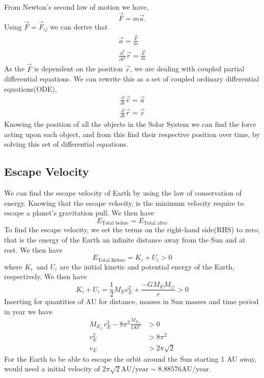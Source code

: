 \documentclass[%
reprint,
nofootinbib,
amsmath,amssymb,
aps,
]{revtex4-1}
\begin{document}
From Newton's second law of motion we have,
\begin{equation}
 \vec{F} = m\vec{a}.
\end{equation}
Using $\vec{F} = \vec{F}_{ij}$ we can derive that 
\begin{equation}
	\begin{split}
		\vec{a} = \frac{\vec{F}}{m}\\
		\frac{\partial^2 }{\partial t^2}\vec{r} = \frac{\vec{F}}{m}
	\end{split}
\end{equation}
As the $\vec{F}$ is dependent on the position $\vec{r}$, we are dealing with coupled partial differential equations. We can rewrite this as a set of coupled ordinary differential equations(ODE), 
\begin{equation}\label{eq:diff}
	\begin{split}
		\frac{\partial}{\partial t} \vec{v} = \vec{a}\\
		\frac{\partial}{\partial t} \vec{r} = \vec{v}
	\end{split}
\end{equation}
Knowing the position of all the objects in the Solar System we can find the force acting upon each object, and from this find their respective position over time, by solving this set of differential equations. 

\subsection{Escape Velocity} %
We can find the escape velocity of Earth by using the law of conservation of energy. Knowing that the escape velocity, is the minimum velocity require to escape a planet's gravitation pull. We then have 
\begin{equation}
	E_{\text{Total before}} = E_{\text{Total after}}
\end{equation}
To find the escape velocity, we set the terms on the right-hand side(RHS) to zero, that is the energy of the Earth an infinite distance away from the Sun and at rest. 
We then have 
\begin{equation}
	E_{\text{Total Before}} = K_i + U_i > 0
\end{equation}
where $K_i$ and $U_i$ are the initial kinetic and potential energy of the Earth, respectively. 
We then have 
\begin{equation}
	K_i + U_i = \frac{1}{2}M_Ev_E^2 + \frac{-GM_EM_{\odot}}{r} > 0
\end{equation}
Inserting for quantities of AU for distance, masses in Sun masses and time period in year we have
\begin{equation}
	\begin{split}
		M_{E_\odot}v_E^2 - 8\pi^2\frac{M_{E_\odot}}{1 \text{AU}} &> 0 \\
		v_E^2 &> 8\pi^2 \\
		v_E &> 2\pi\sqrt{2}
	\end{split}
\end{equation}
For the Earth to be able to escape the orbit around the Sun starting 1 AU away, would need a initial velocity of $2\pi\sqrt{2}\text{AU}/\text{year} \sim 8.88576 \text{AU}/\text{year}$.
\end{document}

